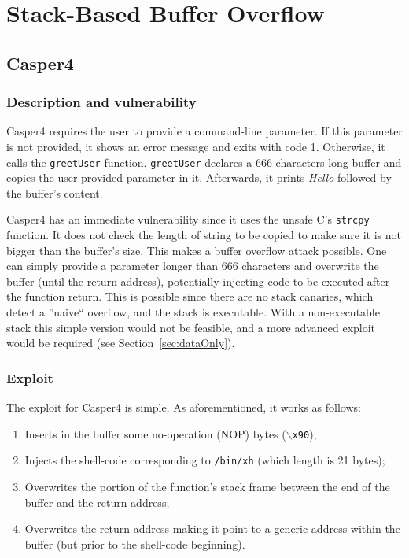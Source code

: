 \section{Stack-Based Buffer Overflow}
\subsection{Casper4}
\subsubsection{Description and vulnerability}
Casper4 requires the user to provide a command-line parameter. If this parameter is not provided, it shows an error message and exits with code 1. Otherwise, it calls the \texttt{greetUser} function. \texttt{greetUser} declares a 666-characters long buffer and copies the user-provided parameter in it. Afterwards, it prints \textit{Hello} followed by the buffer's content.

Casper4 has an immediate vulnerability since it uses the unsafe C's \texttt{strcpy} function. It does not check the length of string to be copied to make sure it is not bigger than the buffer's size. This makes a buffer overflow attack possible. One can simply provide a parameter longer than 666 characters and overwrite the buffer (until the return address), potentially injecting code to be executed after the function return. This is possible since there are no stack canaries, which detect a ''naive`` overflow, and the stack is executable. With a non-executable stack this simple version would not be feasible, and a more advanced exploit would be required (see Section~\ref{sec:dataOnly}).

\subsubsection{Exploit}
The exploit for Casper4 is simple. As aforementioned, it works as follows:
\begin{enumerate}
	\item Inserts in the buffer some no-operation (NOP) bytes (\texttt{$\backslash$x90});
	\item Injects the shell-code corresponding to \texttt{/bin/xh} (which length is 21 bytes);
	\item Overwrites the portion of the function's stack frame between the end of the buffer and the return address;
	\item Overwrites the return address making it point to a generic address within the buffer (but prior to the shell-code beginning).
\end{enumerate}

